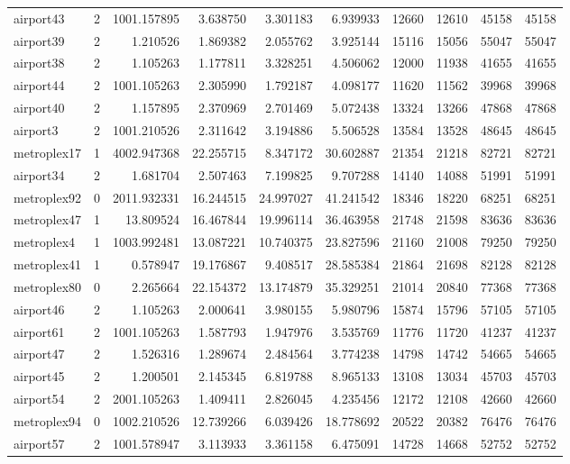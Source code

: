 \begin{longtable}{|l|r|r|r|r|r|r|r|r|r|}
airport43 & 2 & 1001.157895 & 3.638750 & 3.301183 & 6.939933 & 12660 & 12610 & 45158 & 45158 \\
airport39 & 2 & 1.210526 & 1.869382 & 2.055762 & 3.925144 & 15116 & 15056 & 55047 & 55047 \\
airport38 & 2 & 1.105263 & 1.177811 & 3.328251 & 4.506062 & 12000 & 11938 & 41655 & 41655 \\
airport44 & 2 & 1001.105263 & 2.305990 & 1.792187 & 4.098177 & 11620 & 11562 & 39968 & 39968 \\
airport40 & 2 & 1.157895 & 2.370969 & 2.701469 & 5.072438 & 13324 & 13266 & 47868 & 47868 \\
airport3 & 2 & 1001.210526 & 2.311642 & 3.194886 & 5.506528 & 13584 & 13528 & 48645 & 48645 \\
metroplex17 & 1 & 4002.947368 & 22.255715 & 8.347172 & 30.602887 & 21354 & 21218 & 82721 & 82721 \\
airport34 & 2 & 1.681704 & 2.507463 & 7.199825 & 9.707288 & 14140 & 14088 & 51991 & 51991 \\
metroplex92 & 0 & 2011.932331 & 16.244515 & 24.997027 & 41.241542 & 18346 & 18220 & 68251 & 68251 \\
metroplex47 & 1 & 13.809524 & 16.467844 & 19.996114 & 36.463958 & 21748 & 21598 & 83636 & 83636 \\
metroplex4 & 1 & 1003.992481 & 13.087221 & 10.740375 & 23.827596 & 21160 & 21008 & 79250 & 79250 \\
metroplex41 & 1 & 0.578947 & 19.176867 & 9.408517 & 28.585384 & 21864 & 21698 & 82128 & 82128 \\
metroplex80 & 0 & 2.265664 & 22.154372 & 13.174879 & 35.329251 & 21014 & 20840 & 77368 & 77368 \\
airport46 & 2 & 1.105263 & 2.000641 & 3.980155 & 5.980796 & 15874 & 15796 & 57105 & 57105 \\
airport61 & 2 & 1001.105263 & 1.587793 & 1.947976 & 3.535769 & 11776 & 11720 & 41237 & 41237 \\
airport47 & 2 & 1.526316 & 1.289674 & 2.484564 & 3.774238 & 14798 & 14742 & 54665 & 54665 \\
airport45 & 2 & 1.200501 & 2.145345 & 6.819788 & 8.965133 & 13108 & 13034 & 45703 & 45703 \\
airport54 & 2 & 2001.105263 & 1.409411 & 2.826045 & 4.235456 & 12172 & 12108 & 42660 & 42660 \\
metroplex94 & 0 & 1002.210526 & 12.739266 & 6.039426 & 18.778692 & 20522 & 20382 & 76476 & 76476 \\
airport57 & 2 & 1001.578947 & 3.113933 & 3.361158 & 6.475091 & 14728 & 14668 & 52752 & 52752 \\

\end{longtable}

